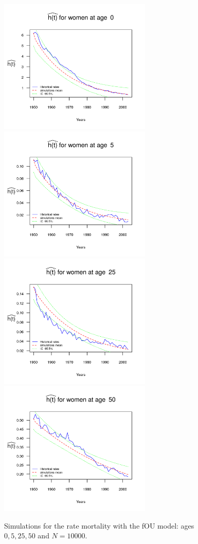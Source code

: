 \documentclass[smallextended]{svjour3}
\begin{document}
\begin{figure}[H]
    \includegraphics[width = 2.85in]{PlotWomen0.png}
    \includegraphics[width = 2.85in]{PlotWomen5.png}
    \includegraphics[width = 2.85in]{PlotWomen25.png}
    \includegraphics[width = 2.85in]{PlotWomen50.png}
    \caption{Simulations for the rate mortality with the fOU model: ages
    $0,5,25,50$ and $N=10000$.}
    \label{graph-simu_FOU1}
\end{figure}\vspace*{0.1cm}
\end{document}
